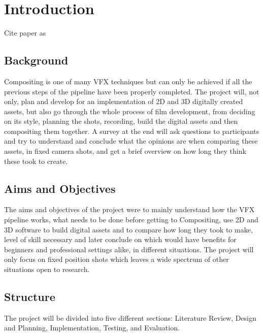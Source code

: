 
\chapter{Introduction}
\label{chap:intro}

Cite paper as \cite{Haley:SecurityRequirementsEngineering}

\section{Background}
Compositing is one of many VFX techniques but can only be achieved if all the previous steps of the pipeline have been properly completed. The project will, not only, plan and develop for an implementation of 2D and 3D digitally created assets, but also go through the whole process of film development, from deciding on its style, planning the shots, recording, build the digital assets and then compositing them together. A survey at the end will ask questions to participants and try to understand and conclude what the opinions are when comparing these assets, in fixed camera shots, and get a brief overview on how long they think these took to create.

\section{Aims and Objectives}
The aims and objectives of the project were to mainly understand how the VFX pipeline works, what needs to be done before getting to Compositing, use 2D and 3D software to build digital assets and to compare how long they took to make, level of skill necessary and later conclude on which would have benefits for beginners and professional settings alike, in different situations. The project will only focus on fixed position shots which leaves a wide spectrum of other situations open to research.

\section{Structure}
\indent The project will be divided into five different sections: Literature Review, Design and Planning, Implementation, Testing, and Evaluation. 

